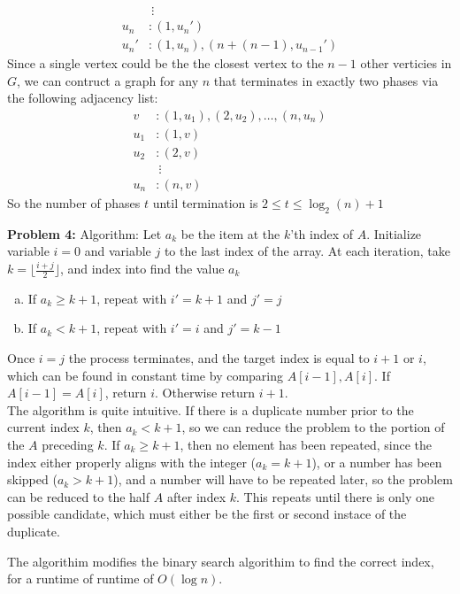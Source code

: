 \documentclass{article}
\begin{document}
\begin{enumerate}[a)]
\begin{align*}
        &\ \vdots \\
        u_n &: (1, u_n') \\
        u_n' &: (1, u_n), (n + (n - 1), u_{n - 1}')
    \end{align*}
    Since a single vertex could be the the closest vertex to the $n - 1$ other verticies in $G$, we can contruct a graph for any $n$ that terminates in exactly two phases via the following adjacency list:
    \begin{align*}
        v &: (1, u_1), (2, u_2), \dots , (n, u_n) \\
        u_1 &: (1, v) \\
        u_2 &: (2, v) \\
        &\ \vdots \\
        u_n &: (n, v) 
    \end{align*}
    So the number of phases $t$ until termination  is $2 \leq t \leq \log_2(n) + 1$
\end{enumerate}
\textbf{Problem 4:} 
Algorithm: Let $a_k$ be the item at the $k$'th index of $A$. Initialize variable $i = 0$ and variable $j$ to the last index of the array. At each iteration, take $k = \lfloor \frac{i + j}{2} \rfloor$, and index into find the value $a_k$
\begin{enumerate}[(a)]
    \item If $a_k \geq k + 1$, repeat with $i' = k + 1$ and $j' = j$
    \item If $a_k < k + 1$, repeat with $i' = i$ and $j' = k - 1$
\end{enumerate}
Once $i = j$ the process terminates, and the target index is equal to $i + 1$ or $i$, which can be found in constant time by comparing $A[i - 1], A[i]$. If $A[i - 1] = A[i]$, return $i$. Otherwise return $i + 1$. \\[0.5ex]
The algorithm is quite intuitive. If there is a duplicate number prior to the current index $k$, then $a_k < k + 1$, so we can reduce the problem to the portion of the $A$ preceding $k$. If $a_k \geq k + 1$, then no element has 
been repeated, since the index either properly aligns with the integer ($a_k = k + 1$), or a number has been skipped ($a_k > k + 1$), and a number will have to be repeated later, so the problem can be reduced to the half $A$ after index $k$. This repeats until there is only one possible candidate, which must either be the first or second instace of the duplicate.

The algorithim modifies the binary search algorithim to find the correct index, for a runtime of runtime of $O(\log n)$.
\end{document}
